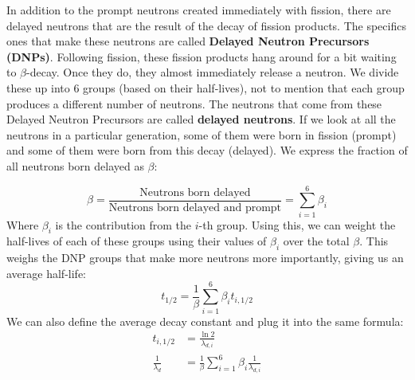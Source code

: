 \documentclass[letter]{article}
\begin{document}
\vspace{10pt}
In addition to the prompt neutrons created immediately with fission,
there are delayed neutrons that are the result of the decay of fission
products. The specifics ones that make these neutrons are called
\textbf{Delayed Neutron Precursors (DNPs)}. Following fission, these
fission products hang around for a bit waiting to $\beta$-decay. Once
they do, they almost immediately release a neutron. We divide these up into 6
groups (based on their half-lives), not to mention that each group produces a different
number of neutrons. The neutrons that come from these Delayed Neutron
Precursors are called \textbf{delayed neutrons}. If we look at all the
neutrons in a particular generation, some of them were born in fission
(prompt) and some of them were born from this decay (delayed). We
express the fraction of all neutrons born delayed as $\beta$:

\begin{equation*}
  \beta = \frac{\text{Neutrons born delayed}}{\text{Neutrons born
      delayed and prompt}} = \sum^6_{i=1}\beta_i
\end{equation*}
Where $\beta_i$ is the contribution from the $i$-th group. Using this,
we can weight the half-lives of each of these groups using their
values of $\beta_i$ over the total $\beta$. This weighs the DNP groups
that make more neutrons more importantly, giving us an average half-life:
\begin{equation*}
  t_{1/2}=\frac{1}{\beta}\sum^6_{i=1}\beta_it_{i,1/2}
\end{equation*}
We can also define the average decay constant and plug it into the
same formula:
\begin{equation*}
  \begin{split}
    t_{i,1/2}&=\frac{\ln{2}}{\lambda_{d,i}}\\
    \frac{1}{\lambda_d}&=\frac{1}{\beta}\sum^6_{i=1}\beta_i\frac{1}{\lambda_{d,i}}
  \end{split}
\end{equation*}
\end{document}
